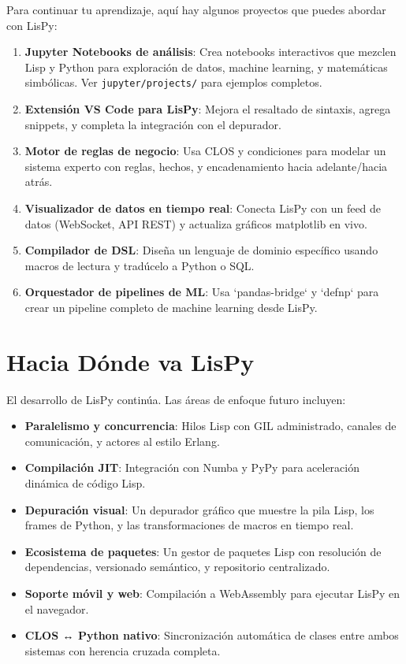 Para continuar tu aprendizaje, aquí hay algunos proyectos que puedes abordar con LisPy:

\begin{enumerate}
\item \textbf{Jupyter Notebooks de análisis}: Crea notebooks interactivos que mezclen Lisp y Python para exploración de datos, machine learning, y matemáticas simbólicas. Ver \texttt{jupyter/projects/} para ejemplos completos.

\item \textbf{Extensión VS Code para LisPy}: Mejora el resaltado de sintaxis, agrega snippets, y completa la integración con el depurador.

\item \textbf{Motor de reglas de negocio}: Usa CLOS y condiciones para modelar un sistema experto con reglas, hechos, y encadenamiento hacia adelante/hacia atrás.

\item \textbf{Visualizador de datos en tiempo real}: Conecta LisPy con un feed de datos (WebSocket, API REST) y actualiza gráficos matplotlib en vivo.

\item \textbf{Compilador de DSL}: Diseña un lenguaje de dominio específico usando macros de lectura y tradúcelo a Python o SQL.

\item \textbf{Orquestador de pipelines de ML}: Usa `pandas-bridge` y `defnp` para crear un pipeline completo de machine learning desde LisPy.
\end{enumerate}

\section{Hacia Dónde va LisPy}

El desarrollo de LisPy continúa. Las áreas de enfoque futuro incluyen:

\begin{itemize}
\item \textbf{Paralelismo y concurrencia}: Hilos Lisp con GIL administrado, canales de comunicación, y actores al estilo Erlang.

\item \textbf{Compilación JIT}: Integración con Numba y PyPy para aceleración dinámica de código Lisp.

\item \textbf{Depuración visual}: Un depurador gráfico que muestre la pila Lisp, los frames de Python, y las transformaciones de macros en tiempo real.

\item \textbf{Ecosistema de paquetes}: Un gestor de paquetes Lisp con resolución de dependencias, versionado semántico, y repositorio centralizado.

\item \textbf{Soporte móvil y web}: Compilación a WebAssembly para ejecutar LisPy en el navegador.

\item \textbf{CLOS ↔ Python nativo}: Sincronización automática de clases entre ambos sistemas con herencia cruzada completa.
\end{itemize}

